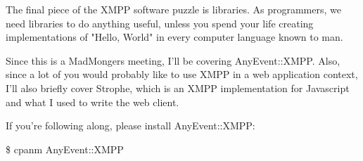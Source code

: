 The final piece of the XMPP software puzzle is libraries.  As programmers, we need
libraries to do anything useful, unless you spend your life creating implementations of
"Hello, World" in every computer language known to man.

\pause
Since this is a MadMongers meeting, I'll be covering AnyEvent::XMPP.  Also, since a lot
of you would probably like to use XMPP in a web application context, I'll also briefly cover
Strophe, which is an XMPP implementation for Javascript and what I used to write the web
client.

\pause

If you're following along, please install AnyEvent::XMPP:

\begin{shaded}
\$ cpanm AnyEvent::XMPP
\end{shaded}
